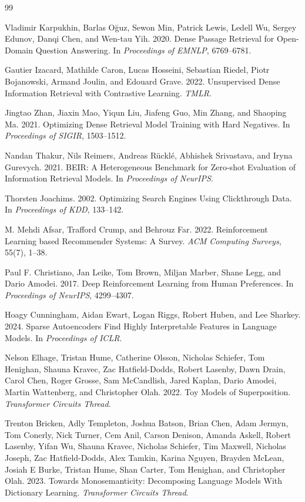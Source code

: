 \documentclass[sigconf]{acmart}
\begin{document}
\begin{thebibliography}{99}

Vladimir Karpukhin, Barlas O\u{g}uz, Sewon Min, Patrick Lewis, Ledell Wu, Sergey Edunov, Danqi Chen, and Wen-tau Yih. 2020. Dense Passage Retrieval for Open-Domain Question Answering. In \textit{Proceedings of EMNLP}, 6769--6781.

Gautier Izacard, Mathilde Caron, Lucas Hosseini, Sebastian Riedel, Piotr Bojanowski, Armand Joulin, and Edouard Grave. 2022. Unsupervised Dense Information Retrieval with Contrastive Learning. \textit{TMLR}.

Jingtao Zhan, Jiaxin Mao, Yiqun Liu, Jiafeng Guo, Min Zhang, and Shaoping Ma. 2021. Optimizing Dense Retrieval Model Training with Hard Negatives. In \textit{Proceedings of SIGIR}, 1503--1512.

Nandan Thakur, Nils Reimers, Andreas R\"uckl\'e, Abhishek Srivastava, and Iryna Gurevych. 2021. BEIR: A Heterogeneous Benchmark for Zero-shot Evaluation of Information Retrieval Models. In \textit{Proceedings of NeurIPS}.

Thorsten Joachims. 2002. Optimizing Search Engines Using Clickthrough Data. In \textit{Proceedings of KDD}, 133--142.

M. Mehdi Afsar, Trafford Crump, and Behrouz Far. 2022. Reinforcement Learning based Recommender Systems: A Survey. \textit{ACM Computing Surveys}, 55(7), 1--38.

Paul F. Christiano, Jan Leike, Tom Brown, Miljan Marber, Shane Legg, and Dario Amodei. 2017. Deep Reinforcement Learning from Human Preferences. In \textit{Proceedings of NeurIPS}, 4299--4307.

Hoagy Cunningham, Aidan Ewart, Logan Riggs, Robert Huben, and Lee Sharkey. 2024. Sparse Autoencoders Find Highly Interpretable Features in Language Models. In \textit{Proceedings of ICLR}.

Nelson Elhage, Tristan Hume, Catherine Olsson, Nicholas Schiefer, Tom Henighan, Shauna Kravec, Zac Hatfield-Dodds, Robert Lasenby, Dawn Drain, Carol Chen, Roger Grosse, Sam McCandlish, Jared Kaplan, Dario Amodei, Martin Wattenberg, and Christopher Olah. 2022. Toy Models of Superposition. \textit{Transformer Circuits Thread}.

Trenton Bricken, Adly Templeton, Joshua Batson, Brian Chen, Adam Jermyn, Tom Conerly, Nick Turner, Cem Anil, Carson Denison, Amanda Askell, Robert Lasenby, Yifan Wu, Shauna Kravec, Nicholas Schiefer, Tim Maxwell, Nicholas Joseph, Zac Hatfield-Dodds, Alex Tamkin, Karina Nguyen, Brayden McLean, Josiah E Burke, Tristan Hume, Shan Carter, Tom Henighan, and Christopher Olah. 2023. Towards Monosemanticity: Decomposing Language Models With Dictionary Learning. \textit{Transformer Circuits Thread}.


\end{thebibliography}
\end{document}
